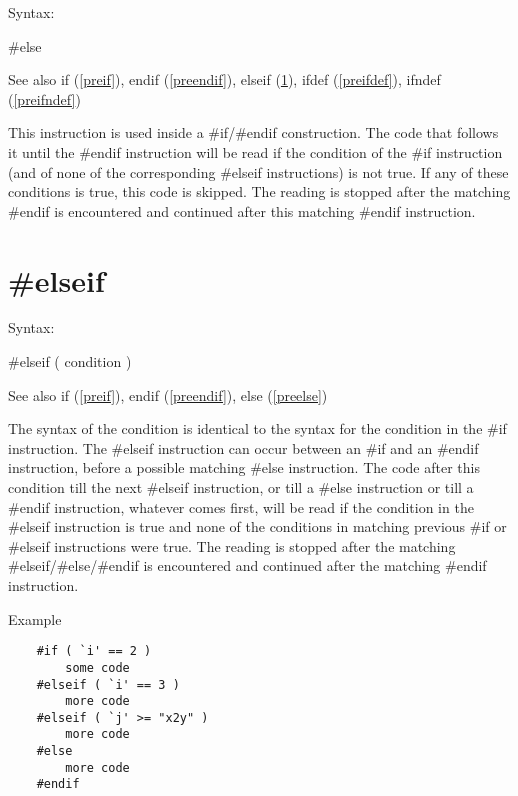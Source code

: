 \noindent Syntax:

\#else
 
\noindent See also if (\ref{preif}),
            endif (\ref{preendif}),
            elseif (\ref{preelseif}),
            ifdef (\ref{preifdef}),
            ifndef (\ref{preifndef})

\noindent This instruction is used inside a 
\#if/\#endif construction. The code that follows 
it until the \#endif instruction will be read if the condition of the \#if 
instruction (and of none of the corresponding \#elseif 
instructions) is not true. If any of these conditions is true, this code is 
skipped. The reading is stopped after the matching \#endif is encountered 
and continued after this matching \#endif instruction.


\section{\#elseif}
\label{preelseif}

\noindent Syntax:

\#elseif ( condition )
 
\noindent See also if (\ref{preif}),
            endif (\ref{preendif}),
            else (\ref{preelse})

\noindent The syntax of the condition is identical to the 
syntax for the condition in the \#if instruction. The \#elseif 
instruction can occur between an \#if and an \#endif 
instruction, before a possible matching \#else instruction. 
The code after this condition till the next \#elseif instruction, or till a 
\#else instruction or till a \#endif instruction, whatever comes first, 
will be read if the condition in the \#elseif instruction is true and none 
of the conditions in matching previous \#if or \#elseif instructions were 
true. The reading is stopped after the matching \#elseif/\#else/\#endif is 
encountered and continued after the matching \#endif instruction.

Example
\begin{verbatim}
    #if ( `i' == 2 )
        some code
    #elseif ( `i' == 3 )
        more code
    #elseif ( `j' >= "x2y" )
        more code
    #else
        more code
    #endif
\end{verbatim}


